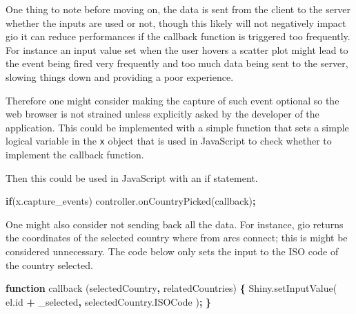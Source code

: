 \documentclass[
]{krantz}
\makeatletter
\newenvironment{Shaded}{\begin{snugshade}}{\end{snugshade}}
\newcommand{\AttributeTok}[1]{\textcolor[rgb]{0.61,0.61,0.61}{#1}}
\newcommand{\CommentTok}[1]{\textcolor[rgb]{0.37,0.37,0.37}{\textit{#1}}}
\newcommand{\ControlFlowTok}[1]{\textcolor[rgb]{0.27,0.27,0.27}{\textbf{#1}}}
\newcommand{\KeywordTok}[1]{\textcolor[rgb]{0.27,0.27,0.27}{\textbf{#1}}}
\newcommand{\NormalTok}[1]{#1}
\newcommand{\OperatorTok}[1]{\textcolor[rgb]{0.43,0.43,0.43}{\textbf{#1}}}
\newcommand{\OtherTok}[1]{\textcolor[rgb]{0.37,0.37,0.37}{#1}}
\newcommand{\StringTok}[1]{\textcolor[rgb]{0.5,0.5,0.5}{#1}}
\newcommand{\VariableTok}[1]{\textcolor[rgb]{0,0,0}{#1}}
\newenvironment{kframe}{%
\medskip{}
\setlength{\fboxsep}{.8em}
 \def\at@end@of@kframe{}%
 \ifinner\ifhmode%
  \def\at@end@of@kframe{\end{minipage}}%
  \begin{minipage}{\columnwidth}%
 \fi\fi%
 \def\FrameCommand##1{\hskip\@totalleftmargin \hskip-\fboxsep
 \colorbox{shadecolor}{##1}\hskip-\fboxsep
     \hskip-\linewidth \hskip-\@totalleftmargin \hskip\columnwidth}%
 \MakeFramed {\advance\hsize-\width
   \@totalleftmargin\z@ \linewidth\hsize
   \@setminipage}}%
 {\par\unskip\endMakeFramed%
 \at@end@of@kframe}
\renewenvironment{Shaded}{\begin{kframe}}{\end{kframe}}
\makeatother
\begin{document}
One thing to note before moving on, the data is sent from the client to the server whether the inputs are used or not, though this likely will not negatively impact gio it can reduce performances if the callback function is triggered too frequently. For instance an input value set when the user hovers a scatter plot might lead to the event being fired very frequently and too much data being sent to the server, slowing things down and providing a poor experience.

Therefore one might consider making the capture of such event optional so the web browser is not strained unless explicitly asked by the developer of the application. This could be implemented with a simple function that sets a simple logical variable in the \texttt{x} object that is used in JavaScript to check whether to implement the callback function.

\begin{Shaded}
\end{Shaded}

Then this could be used in JavaScript with an if statement.

\begin{Shaded}
\begin{Highlighting}[]
\ControlFlowTok{if}\NormalTok{(}\VariableTok{x}\NormalTok{.}\AttributeTok{capture\_events}\NormalTok{)}
  \VariableTok{controller}\NormalTok{.}\AttributeTok{onCountryPicked}\NormalTok{(callback)}\OperatorTok{;}
\end{Highlighting}
\end{Shaded}

One might also consider not sending back all the data. For instance, gio returns the coordinates of the selected country where from arcs connect; this is might be considered unnecessary. The code below only sets the input to the ISO code of the country selected.

\begin{Shaded}
\begin{Highlighting}[]
\KeywordTok{function} \AttributeTok{callback}\NormalTok{ (selectedCountry}\OperatorTok{,}\NormalTok{ relatedCountries) }\OperatorTok{\{}
  \VariableTok{Shiny}\NormalTok{.}\AttributeTok{setInputValue}\NormalTok{(}
    \VariableTok{el}\NormalTok{.}\AttributeTok{id} \OperatorTok{+} \StringTok{\textquotesingle{}\_selected\textquotesingle{}}\OperatorTok{,} 
    \VariableTok{selectedCountry}\NormalTok{.}\AttributeTok{ISOCode}
\NormalTok{  )}\OperatorTok{;}
\OperatorTok{\}}
\end{Highlighting}
\end{Shaded}
\end{document}
